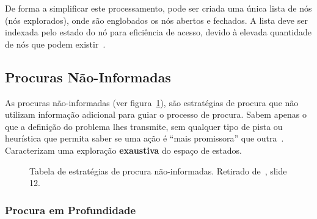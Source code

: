 De forma a simplificar este processamento, pode ser criada uma única lista de nós (nós explorados), onde são englobados os nós abertos e fechados. A lista deve ser indexada pelo estado do nó para eficiência de acesso, devido à elevada quantidade de nós que podem existir~\cite{isel:iasa:slides:proc-espaco-estados-parte-1}.

\subsection{Procuras Não-Informadas}\label{subsec:procuras-nao-informadas}

As procuras não-informadas (ver figura~\ref{fig:tabela-estrategias-procura-nao-informadas}), são estratégias de procura que não utilizam informação adicional para guiar o processo de procura.
Sabem apenas o que a definição do problema lhes transmite, sem qualquer tipo de pista ou heurística que permita saber se uma ação é ``mais promissora'' que outra~\cite{ist:leic:resumos:procura-cega}.
Caracterizam uma exploração \textbf{exaustiva} do espaço de estados.

\begin{figure}[H]
    \begin{center}
    \end{center}
    \caption{Tabela de estratégias de procura não-informadas.
    Retirado de~\cite{isel:iasa:slides:proc-espaco-estados-parte-2}, slide 12.}
    \label{fig:tabela-estrategias-procura-nao-informadas}
\end{figure}

\subsubsection{Procura em Profundidade}\label{subsubsec:procura-profundidade}

